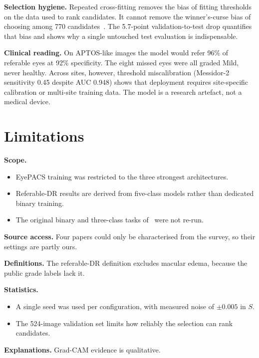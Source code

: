 \documentclass[journal]{IEEEtran}
\begin{document}
\textbf{Selection hygiene.} Repeated cross-fitting removes the bias of fitting thresholds on the data
used to rank candidates. It cannot remove the winner's-curse bias of choosing among 770
candidates~\cite{varma2006bias}. The 5.7-point validation-to-test drop quantifies that bias and shows
why a single untouched test evaluation is indispensable.

\textbf{Clinical reading.} On APTOS-like images the model would refer 96\% of referable eyes at 92\%
specificity. The eight missed eyes were all graded Mild, never healthy. Across sites, however,
threshold miscalibration (Messidor-2 sensitivity 0.45 despite AUC 0.948) shows that deployment
requires site-specific calibration or multi-site training data. The model is a research artefact, not
a medical device.

\section{Limitations}
\textbf{Scope.}
\begin{itemize}
\item EyePACS training was restricted to the three strongest architectures.
\item Referable-DR results are derived from five-class models rather than dedicated binary training.
\item The original binary and three-class tasks of~\cite{butt2022hybrid} were not re-run.
\end{itemize}

\textbf{Source access.} Four papers could only be characterised from the survey, so their settings
are partly ours.

\textbf{Definitions.} The referable-DR definition excludes macular edema, because the public grade
labels lack it.

\textbf{Statistics.}
\begin{itemize}
\item A single seed was used per configuration, with measured noise of $\pm0.005$ in $S$.
\item The 524-image validation set limits how reliably the selection can rank candidates.
\end{itemize}

\textbf{Explanations.} Grad-CAM evidence is qualitative.

\end{document}
